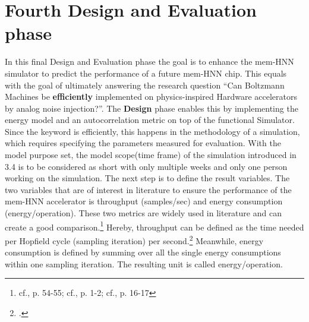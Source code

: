 \section{Fourth Design and Evaluation phase}
In this final Design and Evaluation phase the goal is to enhance the \ac{mem-HNN} simulator to
predict the performance of a future \ac{mem-HNN} chip.
This equals with the goal of ultimately answering the research question ``Can Boltzmann Machines be \textbf{efficiently} implemented on physics-inspired
Hardware accelerators by analog noise injection?''.
The \textbf{Design} phase enables this by implementing the energy model and an autocorrelation metric on top of the functional Simulator.
Since the keyword is efficiently, this happens in the methodology of a simulation, which requires specifying the parameters measured for evaluation.
With the model purpose set, the model scope(time frame) of the simulation introduced in 3.4 is to be considered as short with only multiple weeks and only one person working on the simulation. 
The next step is to define the result variables. The two variables that are of interest in literature to ensure the performance of the
\ac{mem-HNN} accelerator is throughput (samples/sec) and energy consumption (energy/operation). 
These two metrics are widely used in literature and can create a good comparison.\footnote{cf.\cite{bellettiJanusFPGABasedSystem2009}, p. 54-55; cf.\cite{aaditAcceleratingAdaptiveParallel2023}, p. 1-2; cf.\cite{ortega-zamoranoFPGAHardwareAcceleration2016}, p. 16-17}
Hereby, throughput can be defined as the time needed per Hopfield cycle (sampling iteration) per second.\footcite[cf.][6-7]{bohmNoiseinjectedAnalogIsing2022} 
Meanwhile, energy consumption is defined by summing over all the single energy consumptions within one sampling iteration.
The resulting unit is called energy/operation. 


